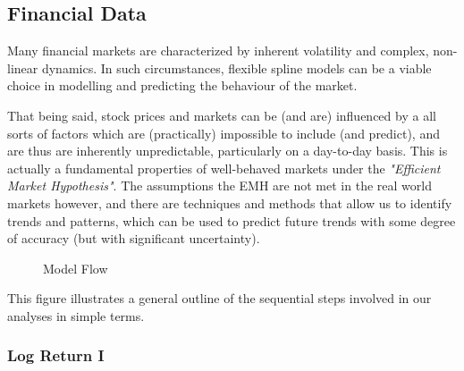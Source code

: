 \documentclass[12pt, twoside,hidelinks]{article}
\theoremstyle{definition}
\numberwithin{equation}{section}
\begin{document}
\subsection{Financial Data}\label{sec:analysis:timeseries}
Many financial markets are characterized by inherent volatility and complex, non-linear dynamics. In such circumstances, flexible spline models can be a viable choice in modelling and predicting the behaviour of the market. 
\newline

That being said, stock prices and markets can be (and are) influenced by a all sorts of factors which are (practically) impossible to include (and predict), and are thus are inherently unpredictable, particularly on a day-to-day basis. This is actually a fundamental properties of well-behaved markets under the \textit{"Efficient Market Hypothesis"}. The assumptions the EMH are not met in the real world markets however, and there are techniques and methods that allow us to identify trends and patterns, which can be used to predict future trends with some degree of accuracy (but with significant uncertainty). 


\begin{figure}
\begin{center}
\caption{Model Flow}
\label{fig:Model_flow}
\end{center}
\end{figure}

This figure illustrates a general outline of the sequential steps involved in our analyses in simple terms. 

\subsubsection{Log Return I}\label{sec:analysis:timeseries:model}
\end{document}
